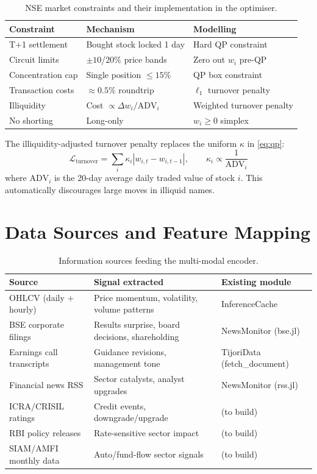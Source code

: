 \documentclass[11pt, a4paper]{article}
\begin{document}
\begin{table}[h]
\centering
\begin{tabular}{lll}
\toprule
\textbf{Constraint} & \textbf{Mechanism} & \textbf{Modelling} \\
\midrule
T+1 settlement      & Bought stock locked 1 day      & Hard QP constraint \\
Circuit limits      & $\pm10$/$20\%$ price bands      & Zero out $w_i$ pre-QP \\
Concentration cap   & Single position $\leq 15\%$     & QP box constraint \\
Transaction costs   & $\approx 0.5\%$ roundtrip       & $\ell_1$ turnover penalty \\
Illiquidity         & Cost $\propto \Delta w_i / \text{ADV}_i$ & Weighted turnover penalty \\
No shorting         & Long-only                       & $w_i \geq 0$ simplex \\
\bottomrule
\end{tabular}
\caption{NSE market constraints and their implementation in the optimiser.}
\end{table}

The illiquidity-adjusted turnover penalty replaces the uniform $\kappa$ in
\eqref{eq:qp}:
\[
  \mathcal{L}_\text{turnover} = \sum_i \kappa_i |w_{i,t} - w_{i,t-1}|,
  \qquad \kappa_i \propto \frac{1}{\text{ADV}_i}
\]
where $\text{ADV}_i$ is the 20-day average daily traded value of stock $i$.
This automatically discourages large moves in illiquid names.

\section{Data Sources and Feature Mapping}

\begin{table}[h]
\centering
\begin{tabular}{p{4cm} p{4.5cm} p{4cm}}
\toprule
\textbf{Source} & \textbf{Signal extracted} & \textbf{Existing module} \\
\midrule
OHLCV (daily + hourly) & Price momentum, volatility, volume patterns & InferenceCache \\
BSE corporate filings & Results surprise, board decisions, shareholding & NewsMonitor (bse.jl) \\
Earnings call transcripts & Guidance revisions, management tone & TijoriData (fetch\_document) \\
Financial news RSS & Sector catalysts, analyst upgrades & NewsMonitor (rss.jl) \\
ICRA/CRISIL ratings & Credit events, downgrade/upgrade & (to build) \\
RBI policy releases & Rate-sensitive sector impact & (to build) \\
SIAM/AMFI monthly data & Auto/fund-flow sector signals & (to build) \\
\bottomrule
\end{tabular}
\caption{Information sources feeding the multi-modal encoder.}
\end{table}
\end{document}
